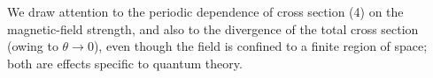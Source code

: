 We draw attention to the periodic dependence of cross section (4) on the magnetic-field strength, and also to the divergence of the total cross section (owing to $\theta\to0$), even though the field is confined to a finite region of space; both are effects specific to quantum theory.
